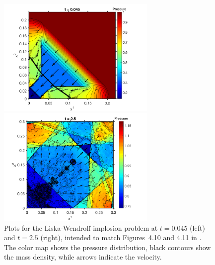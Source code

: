 \documentclass[letterpaper]{jpconf}
\begin{document}
\begin{figure}[h]
  \centering
  \begin{minipage}{18pc}
    \includegraphics[width=18pc]{./Figures/Implosion_01_HighTCI_Astronum_2018}
  \end{minipage}\hspace{0.5pc}%
  \begin{minipage}{18pc}
    \includegraphics[width=18pc]{./Figures/Implosion_02_HighTCI_Astronum_2018}
  \end{minipage}
  \caption{\label{fig:Implosion}Plots for the Liska-Wendroff implosion problem at $t=0.045$ (left) and $t=2.5$ (right), intended to match Figures~4.10 and 4.11 in \cite{liskaWendroff_2003}.  The color map shows the pressure distribution, black contours show the mass density, while arrows indicate the velocity.}
\end{figure}
\end{document}
